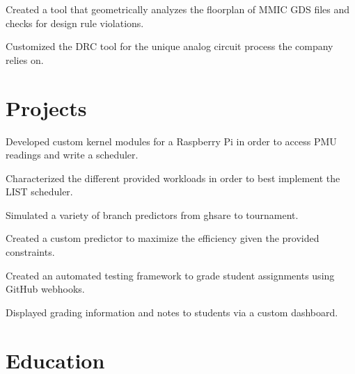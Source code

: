 \documentclass[]{deedy-resume-openfont}
\begin{document}
\begin{tightemize}
\item  Created a tool that geometrically analyzes the floorplan of MMIC GDS files and checks for design rule violations.
\item Customized the DRC tool for the unique analog circuit process the company relies on.
\end{tightemize}
\sectionsep


\section{Projects}

\begin{tightemize}
\item Developed custom kernel modules for a Raspberry Pi in order to access PMU readings and write a scheduler.
\item Characterized the different provided workloads in order to best implement the LIST scheduler.
\end{tightemize}
\sectionsep

\begin{tightemize}
\item Simulated a variety of branch predictors from ghsare to tournament. 
\item Created a custom predictor to maximize the efficiency given the provided constraints.
\end{tightemize}
\sectionsep

\begin{tightemize}
\item Created an automated testing framework to grade student assignments using GitHub webhooks.
\item Displayed grading information and notes to students via a custom dashboard.
\end{tightemize}
\sectionsep

\section{Education}
\sectionsep
\end{document}
